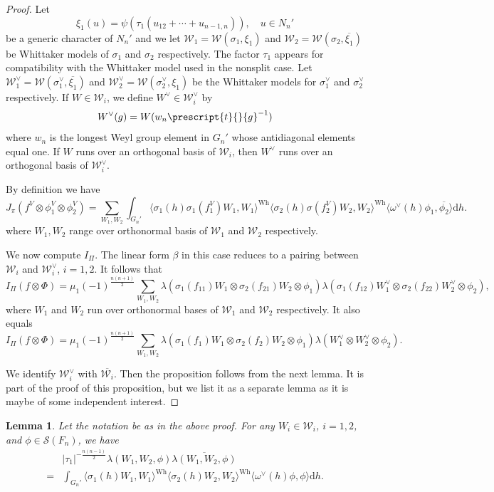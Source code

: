 \documentclass[letterpaper,11pt]{amsart}
\newcommand{\cS}{\mathcal{S}}
\newcommand{\cW}{\mathcal{W}}
\newcommand{\rd}{\mathrm{d}}
\newcommand{\<}{\negthickspace}
\newcommand{\tp}[1]{\prescript{t}{}{#1}}
\providecommand{\abs}[1]{\lvert#1\rvert}
\theoremstyle{definition}
\theoremstyle{plain}
\newtheorem{lemma}[definition]{Lemma}
\theoremstyle{remark}
\numberwithin{equation}{section}
\begin{document}
\begin{proof}
Let
    \[
    \xi_1(u) = \psi(\tau_1(u_{12}+ \cdots + u_{n-1, n})), \quad u \in N_n'
    \]
be a generic character of $N_n'$ and we let $\cW_1 = \cW(\sigma_1, \xi_1)$
and $\cW_2 = \cW(\sigma_2, \overline{\xi_1})$ be Whittaker models of
$\sigma_1$ and $\sigma_2$ respectively. The factor $\tau_1$ appears for
compatibility with the Whittaker model used in the nonsplit case. Let
$\cW_1^\vee = \cW(\sigma_1^\vee, \overline{\xi_1})$ and $\cW_2^\vee =
\cW(\sigma_2^\vee, \xi_1)$ be the Whittaker models for $\sigma_1^\vee$ and
$\sigma_2^\vee$ respectively. If $W \in \cW_i$, we define $W^\vee \in
\cW_i^\vee$ by
    \[
    W^\vee(g) = W(w_n \tp{g}^{-1})
    \]
where $w_n$ is the longest Weyl group element in $G_n'$ whose antidiagonal
elements equal one. If $W$ runs over an orthogonal basis of $\cW_i$, then
$W^\vee$ runs over an orthogonal basis of $\cW_i^\vee$.

By definition we have
    \[
    J_{\pi} (f^V \otimes \phi_1^V \otimes \phi_2^V) =
    \sum_{W_1, W_2}
    \int_{G_n'}
    \langle \sigma_1(h) \sigma_1(f_1^V) W_1, W_1 \rangle^{\mathrm{Wh}}
    \langle \sigma_2(h) \sigma(f_2^V) W_2, W_2 \rangle^{\mathrm{Wh}}
    \langle \omega^\vee(h) \phi_1, \overline{\phi_2} \rangle \rd h.
    \]
where $W_1, W_2$ range over orthonormal basis of $\cW_1$ and $\cW_2$
respectively.

We now compute $I_{\Pi}$. The linear form $\beta$ in this case reduces to a
pairing between $\cW_i$ and $\cW_i^\vee$, $i = 1, 2$. It follows that
    \[
    I_{\Pi}(f \otimes \Phi) = \mu_1(-1)^{\frac{n(n+1)}{2}}  \sum_{W_1, W_2}
    \lambda(\sigma_1(f_{11}) W_1 \otimes \sigma_2(f_{21}) W_2 \otimes \phi_1)
    \lambda(\sigma_1(f_{12}) W_1^\vee \otimes
    \sigma_2(f_{22}) W_2^\vee \otimes \phi_2),
    \]
where $W_1$ and $W_2$ run over orthonormal bases of $\cW_1$ and $\cW_2$
respectively. It also equals
    \[
    I_{\Pi}(f \otimes \Phi) = \mu_1(-1)^{\frac{n(n+1)}{2}}  \sum_{W_1, W_2}
    \lambda(\sigma_1(f_{1}) W_1 \otimes \sigma_2(f_{2}) W_2 \otimes \phi_1)
    \lambda(W_1^\vee \otimes
    W_2^\vee \otimes \phi_2).
    \]

We identify $\cW_i^\vee$ with $\overline{\cW_i}$. Then the proposition
follows from the next lemma. It is part of the proof of this
proposition, but we list it as a separate lemma as it is maybe of some
independent interest.
\end{proof}

\begin{lemma}   \label{lemma:RS}
Let the notation be as in the above proof. For any $W_i \in \cW_i$, $i = 1,
2$, and $\phi\in \cS(F_{n})$, we have
    \[
    \begin{aligned}
    &\abs{\tau_1}^{-\frac{n(n-1)}{2}}
    \lambda(W_1, W_2, \phi)\overline{\lambda(W_1, W_2, \phi)}\\
     = &\int_{G_n'}
    \langle \sigma_1(h) W_1, W_1 \rangle^{\mathrm{Wh}}
    \langle \sigma_2(h) W_2, W_2 \rangle^{\mathrm{Wh}}
    \langle \omega^\vee(h) \phi, \phi \rangle \rd h.
    \end{aligned}
    \]
\end{lemma}
\end{document}
